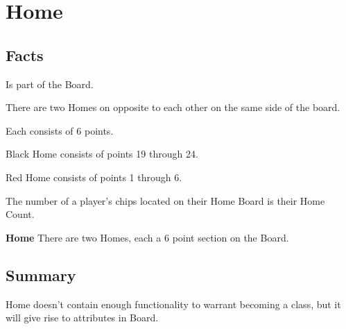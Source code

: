 \section{Home}

\subsection{Facts}

\begin{dashed}
    \item Is part of the Board.
    \item There are two Homes on opposite to each other on the same side of the board.
    \item Each consists of 6 points.
    \item Black Home consists of points 19 through 24.
    \item Red Home consists of points 1 through 6.
    \item The number of a player’s chips located on their Home Board is their Home Count.
\end{dashed}

\noindent
\newline\textbf{Home} There are two Homes, each a 6 point section on the Board.

\subsection{Summary}
Home doesn't contain enough functionality to warrant becoming a class, but it will give rise to attributes in Board.
